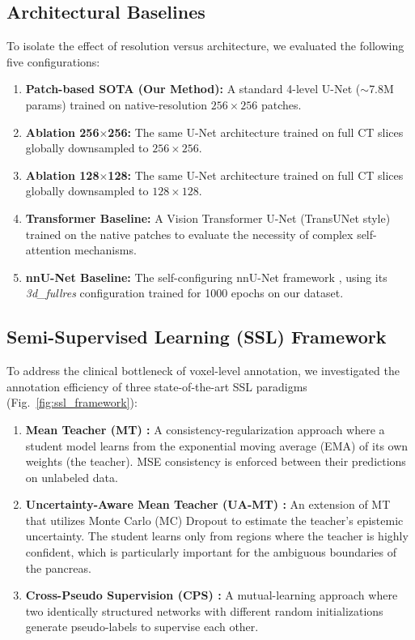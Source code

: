 \documentclass[review,authoryear]{elsarticle}
\begin{document}
\subsection{Architectural Baselines}
To isolate the effect of resolution versus architecture, we evaluated the following five configurations:
\begin{enumerate}
    \item \textbf{Patch-based SOTA (Our Method):} A standard 4-level U-Net ($\sim$7.8M params) trained on native-resolution $256 \times 256$ patches.
    \item \textbf{Ablation 256$\times$256:} The same U-Net architecture trained on full CT slices globally downsampled to $256 \times 256$.
    \item \textbf{Ablation 128$\times$128:} The same U-Net architecture trained on full CT slices globally downsampled to $128 \times 128$.
    \item \textbf{Transformer Baseline:} A Vision Transformer U-Net (TransUNet style) \cite{transunet} trained on the native patches to evaluate the necessity of complex self-attention mechanisms.
    \item \textbf{nnU-Net Baseline:} The self-configuring nnU-Net framework \cite{nnunet}, using its \textit{3d\_fullres} configuration trained for 1000 epochs on our dataset.
\end{enumerate}

\subsection{Semi-Supervised Learning (SSL) Framework}
To address the clinical bottleneck of voxel-level annotation, we investigated the annotation efficiency of three state-of-the-art SSL paradigms (Fig.~\ref{fig:ssl_framework}):
\begin{enumerate}
    \item \textbf{Mean Teacher (MT) \cite{tarvainen2017mean}:} A consistency-regularization approach where a student model learns from the exponential moving average (EMA) of its own weights (the teacher). MSE consistency is enforced between their predictions on unlabeled data.
    \item \textbf{Uncertainty-Aware Mean Teacher (UA-MT) \cite{uamt}:} An extension of MT that utilizes Monte Carlo (MC) Dropout to estimate the teacher's epistemic uncertainty. The student learns only from regions where the teacher is highly confident, which is particularly important for the ambiguous boundaries of the pancreas.
    \item \textbf{Cross-Pseudo Supervision (CPS) \cite{cps}:} A mutual-learning approach where two identically structured networks with different random initializations generate pseudo-labels to supervise each other.
\end{enumerate}
\end{document}
